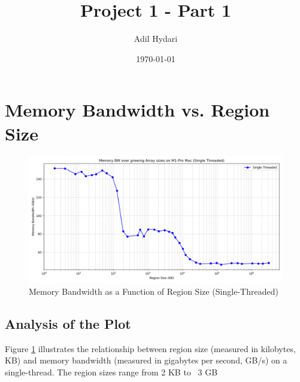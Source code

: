 \documentclass[12pt]{article}
\title{Project 1 - Part 1}
\author{Adil Hydari}
\date{\today}
\begin{document}
	
	\maketitle
	
	
	\section{Memory Bandwidth vs. Region Size}
	
	\begin{figure}[H]
		\centering
		\includegraphics[width=\linewidth]{memory_bandwidth_gbps.png}
		\caption{Memory Bandwidth as a Function of Region Size (Single-Threaded)}
		\label{fig:memory_bandwidth}
	\end{figure}
	
	\subsection{Analysis of the Plot}
	Figure \ref{fig:memory_bandwidth} illustrates the relationship between region size (measured in kilobytes, KB) and memory bandwidth (measured in gigabytes per second, GB/s) on a single-thread. The region sizes range from 2 KB to ~3 GB
	
\end{document}
